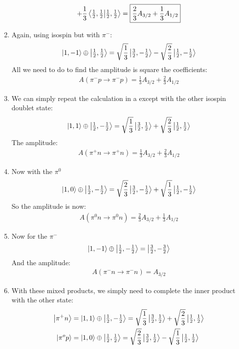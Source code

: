 \documentclass[12pt]{article}
\newcommand{\ppls}{\ket{1,1}}
\newcommand{\pzro}{\ket{1,0}}
\newcommand{\pmin}{\ket{1,-1}}
\newcommand{\prot}{\ket{\tfrac{1}{2}, \tfrac{1}{2}}}
\newcommand{\neut}{\ket{\tfrac{1}{2},-\tfrac{1}{2}}}
\newcommand{\ath}{\ket{\tfrac{3}{2},\tfrac{1}{2}}}
\newcommand{\aoh}{\ket{\tfrac{1}{2},\tfrac{1}{2}}}
\begin{document}
\begin{enumerate}[label=\alph*.)]
\begin{align*}
    +\frac{1}{3}\ip{\tfrac{1}{2},\tfrac{1}{2}}
    =\boxed{\frac{2}{3}A_{3/2}+\frac{1}{3}A_{1/2}}
  \end{align*}
\item Again, using isospin but with $\pi^-$:
  \begin{align*}
    \pmin\oplus\prot = \sqrt{\frac{1}{3}}\ket{\tfrac{3}{2},-\tfrac{1}{2}}
    -\sqrt{\frac{2}{3}}\ket{\tfrac{1}{2},-\tfrac{1}{2}}
  \end{align*}
  All we need to do to find the amplitude is square the coefficients:
  \begin{align*}
    A(\pi^-p\to\pi^-p)=\boxed{\frac{1}{3}A_{3/2}+\frac{2}{3}A_{1/2}}
  \end{align*}
\item We can simply repeat the calculation in a except with the other isospin doublet state:
  \begin{align*}
    \ppls\oplus\neut=\sqrt{\frac{1}{3}}\ket{\tfrac{3}{2},\tfrac{1}{2}}
                    +\sqrt{\frac{2}{3}}\ket{\tfrac{1}{2},\tfrac{1}{2}}
  \end{align*}
  The amplitude:
  \begin{align*}
    A(\pi^+n\to\pi^+n)=\boxed{\frac{1}{3}A_{3/2}+\frac{2}{3}A_{1/2}}
  \end{align*}
\item Now with the $\pi^0$
  \begin{align*}
    \pzro\oplus\neut=\sqrt{\frac{2}{3}}\ket{\tfrac{3}{2},-\tfrac{1}{2}}
                    +\sqrt{\frac{1}{3}}\ket{\tfrac{1}{2},-\tfrac{1}{2}}
  \end{align*}
  So the amplitude is now:
  \begin{align*}
    A(\pi^0n\to\pi^0n)=\boxed{\frac{2}{3}A_{3/2}+\frac{1}{3}A_{1/2}}
  \end{align*}
\item Now for the $\pi^-$
  \begin{align*}
    \pmin\oplus\neut=\ket{\tfrac{3}{2},-\tfrac{3}{2}}
  \end{align*}
  And the amplitude:
  \begin{align*}
    A(\pi^-n\to\pi^-n)=\boxed{A_{3/2}}
  \end{align*}
\item With these mixed products, we simply need to complete the inner product with the other state:
  \begin{align*}
    \ket{\pi^+n}&=\ppls\oplus\neut=\sqrt{\frac{1}{3}}\ath+\sqrt{\frac{2}{3}}\aoh\\
    \ket{\pi^op}&=\pzro\oplus\prot=\sqrt{\frac{2}{3}}\ath-\sqrt{\frac{1}{3}}\aoh

\end{align*}
\end{enumerate}
\end{document}
